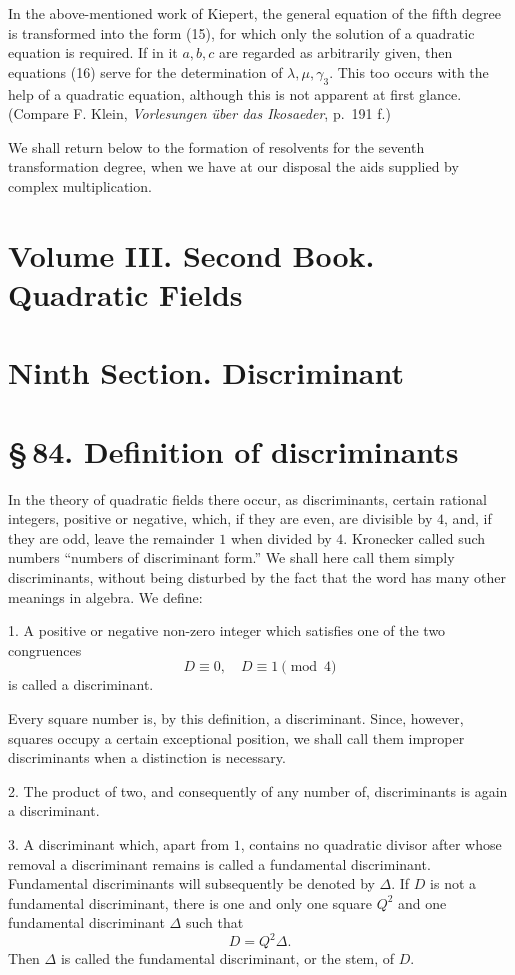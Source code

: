 \documentclass[11pt]{article}
\begin{document}
In the above-mentioned work of Kiepert, the general equation of the fifth degree is transformed into the form (15), for which only the solution of a quadratic equation is required. If in it \(a,b,c\) are regarded as arbitrarily given, then equations (16) serve for the determination of \(\lambda,\mu,\gamma_3\). This too occurs with the help of a quadratic equation, although this is not apparent at first glance. (Compare F. Klein, \emph{Vorlesungen über das Ikosaeder}, p.~191 f.)

We shall return below to the formation of resolvents for the seventh transformation degree, when we have at our disposal the aids supplied by complex multiplication.


\section*{Volume III. Second Book. Quadratic Fields}
\section*{Ninth Section. Discriminant}
\section*{\S\,84. Definition of discriminants}

In the theory of quadratic fields there occur, as discriminants, certain rational integers, positive or negative, which, if they are even, are divisible by \(4\), and, if they are odd, leave the remainder \(1\) when divided by \(4\).  Kronecker called such numbers ``numbers of discriminant form.''  We shall here call them simply discriminants, without being disturbed by the fact that the word has many other meanings in algebra.  We define:

1. A positive or negative non-zero integer which satisfies one of the two congruences
\begin{equation}
        D\equiv0,\quad D\equiv1\pmod 4
\tag{1}
\end{equation}
is called a discriminant.

Every square number is, by this definition, a discriminant.  Since, however, squares occupy a certain exceptional position, we shall call them improper discriminants when a distinction is necessary.

2. The product of two, and consequently of any number of, discriminants is again a discriminant.

3. A discriminant which, apart from \(1\), contains no quadratic divisor after whose removal a discriminant remains is called a fundamental discriminant.  Fundamental discriminants will subsequently be denoted by \(\Delta\).  If \(D\) is not a fundamental discriminant, there is one and only one square \(Q^2\) and one fundamental discriminant \(\Delta\) such that
\begin{equation}
        D=Q^2\Delta.
\tag{2}
\end{equation}
Then \(\Delta\) is called the fundamental discriminant, or the stem, of \(D\).
\end{document}
